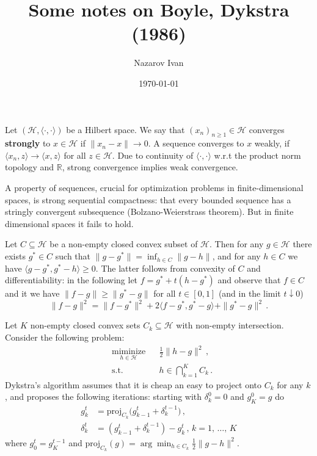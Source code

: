 \documentclass[a4paper]{article}
\title{Some notes on Boyle, Dykstra (1986)}
\author{Nazarov Ivan}
\date{\today}
\newcommand{\Hcal}{\mathcal{H}}
\newcommand{\real}{\mathbb{R}}
\begin{document}
\maketitle

Let $(\Hcal, \langle\cdot,\cdot\rangle)$ be a Hilbert space. We say that $(x_n)_{n\geq1} 
\in \Hcal$ converges {\bf strongly} to $x\in\Hcal$ if $\|x_n - x\| \to 0$. A sequence 
converges to $x$ weakly, if $\langle x_n, z \rangle \to \langle x, z\rangle$ for all
$z\in \Hcal$. Due to continuity of $\langle\cdot,\cdot\rangle$ w.r.t the product norm
topology and $\real$, strong convergence implies weak convergence.

A property of sequences, crucial for optimization problems in finite-dimensional spaces,
is strong sequential compactness: that every bounded sequence has a stringly convergent
subsequence (Bolzano-Weierstrass theorem). But in finite dimensional spaces it fails to
hold.

Let $C \subseteq \Hcal$ be a non-empty closed convex subset of $\Hcal$. Then for any
$g\in \Hcal$ there exists $g^*\in C$ such that $\|g - g^*\| = \inf_{h\in C} \|g - h\|$,
and for any $h\in C$ we have $\langle g - g^*, g^* - h\rangle \geq 0$. The latter follows
from convexity of $C$ and differentiability: in the following let $f = g^* + t (h -g ^*)$
and observe that $f \in C$ and it we have $\|f - g\| \geq \|g^* - g\|$ for all $t\in
[0, 1]$ (and in the limit $t\downarrow 0$)
\begin{equation*}
  \|f - g\|^2
    = \|f - g^*\|^2 + 2 \langle f - g^*, g^* - g\rangle + \|g^* - g\|^2
    \,.
\end{equation*}

Let $K$ non-empty closed convex sets $C_k \subseteq \Hcal$ with non-empty intersection.
Consider the following problem:
\begin{equation} \label{eq:k-projection}
  \begin{aligned}
    & \underset{h \in \Hcal}{\text{miminize}}
      & & \tfrac12 \|h - g\|^2
          \,, \\
    & \text{s.t.}
      & & h \in \bigcap_{k=1}^K C_k
          \,.
  \end{aligned}
\end{equation}
Dykstra's algorithm assumes that it is cheap an easy to project onto $C_k$ for any $k$,
and proposes the following iterations: starting with $\delta^0_k = 0$ and $g^0_K = g$ do
\begin{align}
  g^t_k
    &= \mathrm{proj}_{C_k}\bigl( g^t_{k-1} + \delta^{t-1}_k \bigr)
    \,, \\
  \delta^t_k
    &= (g^t_{k-1} + \delta^{t-1}_k) - g^t_k
    \,,
    \, k = 1,\,\ldots,\,K
\end{align}
where $g^t_0 = g^{t-1}_K$ and $\mathrm{proj}_{C_k}(g) = \arg\min_{h \in C_k} \tfrac12 \|g - h\|^2$.
\end{document}
